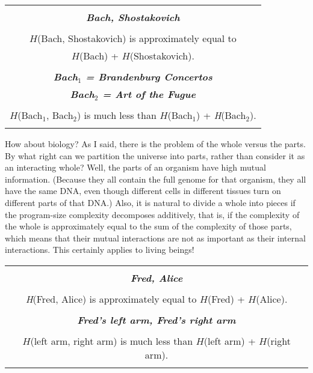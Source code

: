 \documentclass[12pt]{book}
\begin{document}
\begin{center}
\begin{tabular}{|c|}
\hline
\\
\textbf{\large \emph{Bach, Shostakovich}}
\\ \\
$H$(Bach, Shostakovich) is approximately equal to 
\\
$H$(Bach) + $H$(Shostakovich).
\\ \\
\textbf{\large \emph{Bach$_1$ = Brandenburg Concertos}}
\\
\textbf{\large \emph{Bach$_2$ = Art of the Fugue}}
\\ \\
$H$(Bach$_1$, Bach$_2$) is much less than $H$(Bach$_1$) + \emph{H}(Bach$_2$).
\\
\\
\hline
\end{tabular}
\end{center}
 
How about biology?  As I said, there is the problem of the whole versus the parts.  By what right
can we partition the universe into parts, rather than consider it as an interacting whole?
Well, the parts of an organism have high mutual information.  
(Because they all contain the full genome for that organism, they all have the same DNA, even
though different cells in different tissues turn on different parts of that DNA.)
Also, it is natural to divide
a whole into pieces if the program-size complexity decomposes additively, that is, if the
complexity of the whole is approximately equal to the sum of the complexity of those parts, 
which means
that their mutual interactions are not as important as their internal interactions.  This
certainly applies to living beings!
 
\begin{center}
\begin{tabular}{|c|}
\hline
\\
\textbf{\large \emph{Fred, Alice}}
\\ \\
\emph{H}(Fred, Alice) is approximately equal to $H$(Fred) + $H$(Alice).
\\ \\
\textbf{\large \emph{Fred's left arm, Fred's right arm}}
\\ \\
$H$(left arm, right arm) is much less than $H$(left arm) + $H$(right arm).
\\
\\
\hline
\end{tabular}
\end{center}
 
\end{document}

